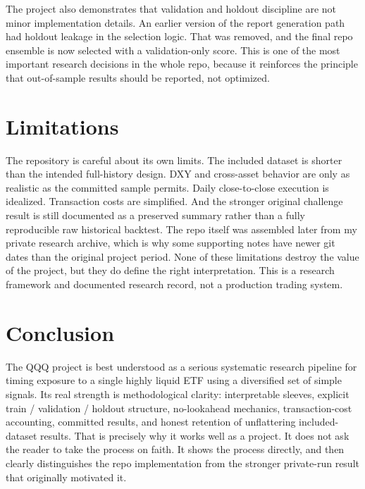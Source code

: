 \documentclass[11pt]{article}
\begin{document}
The project also demonstrates that validation and holdout discipline are not
minor implementation details. An earlier version of the report generation path
had holdout leakage in the selection logic. That was removed, and the final
repo ensemble is now selected with a validation-only score. This is one of the
most important research decisions in the whole repo, because it reinforces the
principle that out-of-sample results should be reported, not optimized.

\section*{Limitations}

The repository is careful about its own limits. The included dataset is
shorter than the intended full-history design. DXY and
cross-asset behavior are only as realistic as the committed sample permits.
Daily close-to-close execution is idealized. Transaction costs are simplified.
And the stronger original challenge result is still documented as a preserved
summary rather than a fully reproducible raw historical backtest. The repo
itself was assembled later from my private research archive, which is why some
supporting notes have newer git dates than the original project period. None of these
limitations destroy the value of the project, but they do define the right
interpretation. This is a research framework and documented research record,
not a production trading system.

\section*{Conclusion}

The QQQ project is best understood as a serious systematic research pipeline for
timing exposure to a single highly liquid ETF using a diversified set of simple
signals. Its real strength is methodological clarity: interpretable sleeves,
explicit train / validation / holdout structure, no-lookahead mechanics,
transaction-cost accounting, committed results, and honest retention of
unflattering included-dataset results. That is precisely why it works well as a
 project. It does not ask the reader to take the process on
faith. It shows the process directly, and then clearly distinguishes the repo
implementation from the stronger private-run result that originally motivated it.
\end{document}
